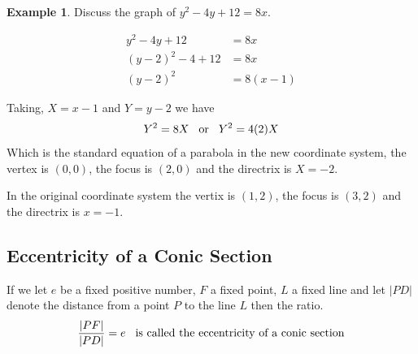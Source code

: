 \documentclass[11pt,a4paper]{article}
\theoremstyle{definition}
\newtheorem{exa}[thm]{Example}
\begin{document}
\begin{exa}


Discuss the graph of $y^2 - 4y + 12 = 8x$.

\begin{align*}
y^2 - 4y + 12 & = 8x\\
(y - 2)^2 - 4 + 12 & = 8x\\
(y - 2)^2 & = 8(x-1)
\end{align*}

Taking, $X = x -1$ and $Y = y -2$ we have $$Y^2 = 8X\hspace{0.3cm}\text{or}\hspace{0.3cm} Y^2 = 4(2)X$$
Which is the standard equation of  a parabola in the new coordinate system, the vertex is $(0,0)$, the focus is $(2,0)$ and the directrix is $X = -2$.


In the original coordinate system the vertix is $(1,2)$, the focus is $(3,2)$ and the directrix is $ x = -1$.


\begin{figure}[H]
\centering
{}
\end{figure}

\vspace{1.5cm}
\end{exa}

\subsection{Eccentricity of a Conic Section}
If we let $e$ be a fixed positive number, $F$ a fixed point, $L$ a fixed line and let $\left|PD\right|$ denote the distance from a point $P$ to the line $L$ then the ratio. $$\frac{
\left|PF\right|
}{\left|PD\right|
} = e\hspace{0.3cm}\text{is called the eccentricity of a conic section}$$
\end{document}
